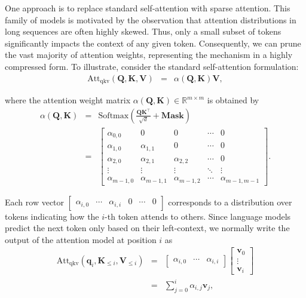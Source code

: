 One approach is to replace standard self-attention with sparse attention. This family of models is motivated by the observation that attention distributions in long sequences are often highly skewed. Thus, only a small subset of tokens significantly impacts the context of any given token. Consequently, we can prune the vast majority of attention weights, representing the mechanism in a highly compressed form. To illustrate, consider the standard self-attention formulation:
\begin{eqnarray}
\mathrm{Att}_{\mathrm{qkv}}(\mathbf{Q},\mathbf{K},\mathbf{V}) & = & \alpha(\mathbf{Q},\mathbf{K}) \mathbf{V} \label{eq:qkv-attention-attention-weights},
\end{eqnarray}

\noindent where the attention weight matrix $\alpha(\mathbf{Q},\mathbf{K}) \in \mathbb{R}^{m \times m}$ is obtained by
\begin{eqnarray}
\alpha(\mathbf{Q},\mathbf{K}) & = & \mathrm{Softmax}(\frac{\mathbf{Q} \mathbf{K}^\top}{\sqrt{d}} + \mathbf{Mask}) \nonumber \\
                              & = & \begin{bmatrix} \alpha_{0,0} & 0 & 0 & \cdots & 0 \\ \alpha_{1,0} & \alpha_{1,1} & 0 & \cdots & 0 \\ \alpha_{2,0} & \alpha_{2,1} & \alpha_{2,2} & \cdots & 0 \\ \vdots & \vdots & \vdots & \ddots & \vdots \\ \alpha_{m-1,0} & \alpha_{m-1,1} & \alpha_{m-1,2} & \cdots & \alpha_{m-1,m-1} \end{bmatrix}.
\end{eqnarray}

Each row vector $\begin{bmatrix} \alpha_{i,0} & \cdots & \alpha_{i,i} & 0 & \cdots & 0 \end{bmatrix}$ corresponds to a distribution over tokens indicating how the $i$-th token attends to others. Since language models predict the next token only based on their left-context, we normally write the output of the attention model at position $i$ as
\begin{eqnarray}
\mathrm{Att}_{\mathrm{qkv}}(\mathbf{q}_i,\mathbf{K}_{\le i},\mathbf{V}_{\le i}) & = & \begin{bmatrix} \alpha_{i,0} & \cdots & \alpha_{i,i}  \end{bmatrix} \begin{bmatrix} \mathbf{v}_0 \\ \vdots \\ \mathbf{v}_{i} \end{bmatrix} \nonumber \\
                                                                                & = & \sum_{j = 0}^{i} \alpha_{i,j} \mathbf{v}_{j},
\end{eqnarray}


